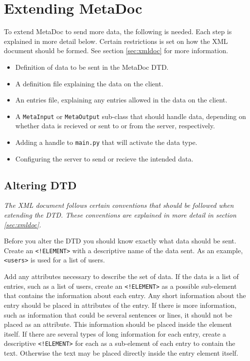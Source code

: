 \newpage
\section{Extending MetaDoc}
To extend MetaDoc to send more data, the following is needed. Each step is 
explained in more detail below. Certain restrictions is set on how the XML
document should be formed. See section \ref{sec:xmldoc} for more information.

\begin{itemize}
    \item
        Definition of data to be sent in the MetaDoc DTD.
    \item
        A definition file explaining the data on the client.
    \item
        An entries file, explaining any entries allowed in the data on the 
        client.
    \item
        A \texttt{MetaInput} or \texttt{MetaOutput} sub-class that should
        handle data, depending on whether data is recieved or sent to or from
        the server, respectively.
    \item
        Adding a handle to \texttt{main.py} that will activate the data type.
    \item
        Configuring the server to send or recieve the intended data.
\end{itemize}

\subsection{Altering DTD}
\textit{The XML document follows certain conventions that should be followed when
extending the DTD. These conventions are explained in more detail in section
\ref{sec:xmldoc}.}

Before you alter the DTD you should know exactly what data should be sent.
Create an \texttt{<!ELEMENT>} with a descriptive name of the data sent. As an
example, \texttt{<users>} is used for a list of users. 

Add any attributes necessary to describe the set of data. If the data is a list
of entries, such as a list of users, create an \texttt{<!ELEMENT>} as a
possible sub-element that contains the information about each entry. Any short
information about the entry should be placed in attributes of the entry. If
there is more information, such as information that could be several sentences
or lines, it should not be placed as an attribute. This information should be
placed inside the element itself. If there are several types of long
information for each entry, create a descriptive \texttt{<!ELEMENT>} for each
as a sub-element of each entry to contain the text. Otherwise the text may be
placed directly inside the entry element itself. 

